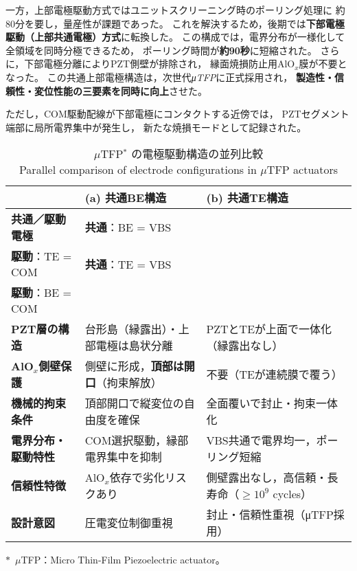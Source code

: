 \documentclass[conference]{IEEEtran}
\begin{document}
一方，上部電極駆動方式ではユニットスクリーニング時のポーリング処理に
約80分を要し，量産性が課題であった。
これを解決するため，後期では\textbf{下部電極駆動（上部共通電極）方式}に転換した。
この構成では，電界分布が一様化して全領域を同時分極できるため，
ポーリング時間が\textbf{約90秒}に短縮された。
さらに，下部電極分離によりPZT側壁が排除され，
縁面焼損防止用AlO$_x$膜が不要となった。
この共通上部電極構造は，次世代\textit{μTFP}に正式採用され，
\textbf{製造性・信頼性・変位性能の三要素を同時に向上}させた。

ただし，COM駆動配線が下部電極にコンタクトする近傍では，
PZTセグメント端部に局所電界集中が発生し，
新たな焼損モードとして記録された。

\begin{table}[!t]
\centering
\caption{%
$\mu$TFP$^\ast$ の電極駆動構造の並列比較\\
Parallel comparison of electrode configurations in $\mu$TFP actuators
}
\label{tab:utfp_structure}
\renewcommand{\arraystretch}{1.12}
\setlength{\tabcolsep}{2.2pt}
\footnotesize
\begin{tabular}{@{}p{2.7cm}p{3.25cm}p{3.25cm}@{}}
\toprule
 & \textbf{(a) 共通BE構造} & \textbf{(b) 共通TE構造} \\ \midrule
\textbf{共通／駆動電極} &
\textbf{共通}：BE = VBS\\
\textbf{駆動}：TE = COM &
\textbf{共通}：TE = VBS\\
\textbf{駆動}：BE = COM \\[2pt]

\textbf{PZT層の構造} &
台形島（縁露出）・上部電極は島状分離 &
PZTとTEが上面で一体化（縁露出なし） \\[2pt]

\textbf{AlO$_x$側壁保護} &
側壁に形成，\textbf{頂部は開口}（拘束解放） &
不要（TEが連続膜で覆う） \\[2pt]

\textbf{機械的拘束条件} &
頂部開口で縦変位の自由度を確保 &
全面覆いで封止・拘束一体化 \\[2pt]

\textbf{電界分布・駆動特性} &
COM選択駆動，縁部電界集中を抑制 &
VBS共通で電界均一，ポーリング短縮 \\[2pt]

\textbf{信頼性特徴} &
AlO$_x$依存で劣化リスクあり &
側壁露出なし，高信頼・長寿命（$\ge 10^9$ cycles） \\[2pt]

\textbf{設計意図} &
圧電変位制御重視 &
封止・信頼性重視（μTFP採用） \\
\bottomrule
\end{tabular}
\vspace{-3pt}
\begin{flushleft}
\footnotesize
$\ast$~$\mu$TFP：Micro Thin-Film Piezoelectric actuator。
\end{flushleft}
\end{table}
\end{document}
